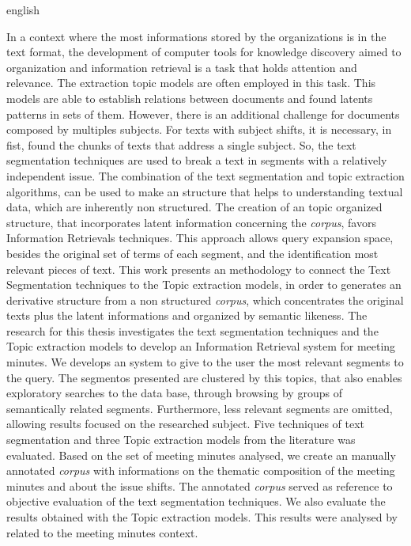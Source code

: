 \begin{resumo}[Abstract]
 \begin{otherlanguage*}{english}




In a context where the most informations stored by the organizations is in the text format, the development of computer tools for knowledge discovery aimed to organization and information retrieval is a task that holds attention and relevance.
%
The extraction topic models are often employed in this task. This models are able  to establish relations between documents and found latents patterns in sets of them.  
However, there is an additional challenge for documents composed by multiples subjects. For texts with subject shifts, it is necessary, in fist, found the chunks of texts that address a single subject. So, the text segmentation techniques are used to break a text in segments with a relatively independent issue.  
The combination of the text segmentation and topic extraction algorithms, can be used to make an structure that helps to understanding textual data, which are inherently non structured.  
The creation of an topic organized structure, that incorporates latent information concerning the \textit{corpus}, favors Information Retrievals techniques. This approach allows query expansion space, besides the original set of terms of each segment, and the identification most relevant pieces of text.  
This work presents an methodology to connect the Text Segmentation techniques to the Topic extraction models, in order to generates an derivative structure from a non structured \textit{corpus}, which concentrates the original texts plus the latent informations and organized by semantic likeness.  
The research for this thesis investigates the text segmentation techniques and the Topic extraction models to develop an Information Retrieval system for meeting minutes.  
We develops an system to give to the user the most relevant segments to the query. The segmentos presented are clustered by this topics, that also enables exploratory searches to the data base, through browsing by groups of semantically related segments. Furthermore, less relevant segments are omitted, allowing results focused on the researched subject.  
Five techniques of text segmentation and three Topic extraction models from the literature was evaluated. Based on the set of meeting minutes analysed, we create an manually annotated \textit{corpus} with informations on the thematic composition of the meeting minutes and about the issue shifts. The annotated \textit{corpus} served as reference to objective evaluation of the text segmentation techniques. We also evaluate the results obtained with the Topic extraction models. This results were analysed by related to the meeting minutes context.  

\end{otherlanguage*}
\end{resumo}
